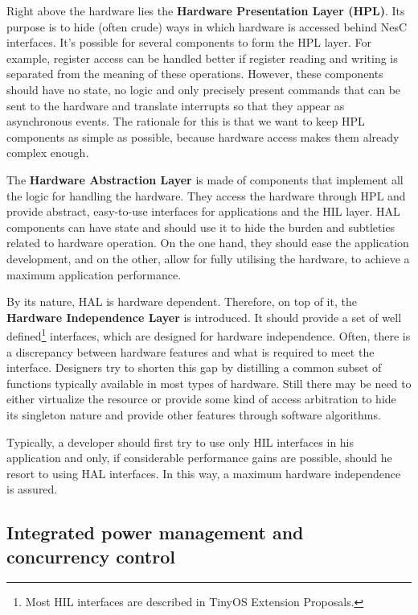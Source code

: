 Right above the hardware lies the {\bf Hardware Presentation Layer (HPL)}. Its purpose is to hide (often crude) ways in which hardware is accessed behind NesC interfaces. It's possible for several components to form the HPL layer. For example, register access can be handled better if register reading and writing is separated from the meaning of these operations. However, these components should have no state, no logic and only precisely present commands that can be sent to the hardware and translate interrupts so that they appear as asynchronous events. The rationale for this is that we want to keep HPL components as simple as possible, because hardware access makes them already complex enough.

The {\bf Hardware Abstraction Layer} is made of components that implement all the logic for handling the hardware. They access the hardware through HPL and provide abstract, easy-to-use interfaces for applications and the HIL layer. HAL components can have state and should use it to hide the burden and subtleties related to hardware operation. On the one hand, they should ease the application development, and on the other, allow for fully utilising the hardware, to achieve a maximum application performance.

By its nature, HAL is hardware dependent. Therefore, on top of it, the {\bf Hardware Independence Layer} is introduced. It should provide a set of well defined\footnote{Most HIL interfaces are described in TinyOS Extension Proposals.} interfaces, which are designed for hardware independence. Often, there is a discrepancy between hardware features and what is required to meet the interface.  Designers try to shorten this gap by distilling a common subset of functions typically available in most types of hardware. Still there may be need to either virtualize the resource or provide some kind of access arbitration to hide its singleton nature and provide other features through software algorithms.

Typically, a developer should first try to use only HIL interfaces in his application and only, if considerable performance gains are possible, should he resort to using HAL interfaces. In this way, a maximum hardware independence is assured.

\subsection{Integrated power management and concurrency control}
\label{ch:concurrency_and_power}

